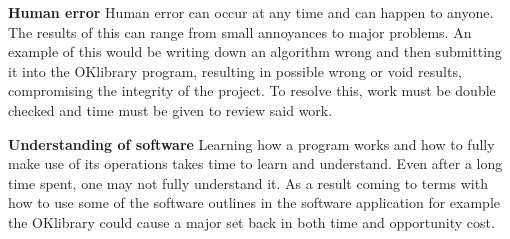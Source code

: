 \documentclass[11pt,a4paper]{article}
\begin{document}
\textbf{Human error}\newline
Human error can occur at any time and can happen to anyone. The results of this can range from small annoyances to major problems. An example of this would be writing down an algorithm wrong and then submitting it into the OKlibrary program, resulting in possible wrong or void results, compromising the integrity of the project. To resolve this, work must be double checked and time must be given to review said work.\newline

\textbf{Understanding of software}\newline
Learning how a program works and how to fully make use of its operations takes time to learn and understand. Even after a long time spent, one may not fully understand it. As a result coming to terms with how to use some of the software outlines in the software application for example the OKlibrary could cause a major set back in both time and opportunity cost. 





\end{document}
